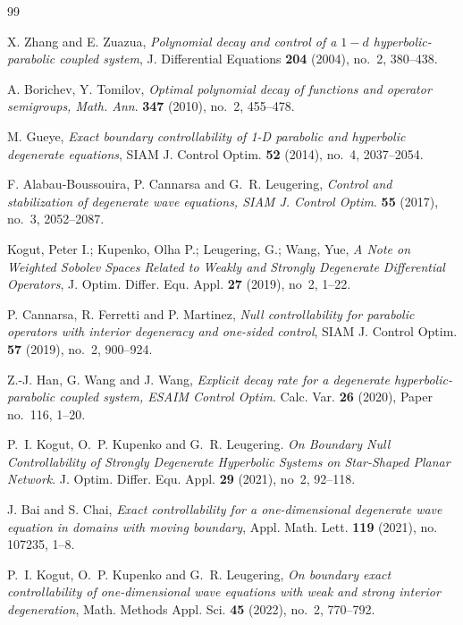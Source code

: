\documentclass[twoside]{article}
\theoremstyle{noparens}
\theoremstyle{definition}
\numberwithin{equation}{section}
\numberwithin{figure}{section}
\begin{document}
\begin{thebibliography}{99}

\setlength{\itemsep}{0ex}


{\footnotesize

  X. Zhang and E. Zuazua, \textit{Polynomial decay and control of a $1-d$ hyperbolic-parabolic coupled system}, J. Differential Equations {\bf 204} (2004), no.~2, 380--438.

 A. Borichev, Y. Tomilov, \textit{Optimal polynomial decay of functions and operator semigroups, Math. Ann}. {\bf 347} (2010), no.~2, 455--478.

 M. Gueye, \textit{Exact boundary controllability of 1-D parabolic and hyperbolic degenerate equations}, SIAM J. Control Optim. {\bf 52} (2014), no.~4, 2037--2054.

 F. Alabau-Boussouira, P. Cannarsa and G.~R. Leugering, \textit{Control and stabilization of degenerate wave equations, SIAM J. Control Optim}. {\bf 55} (2017), no.~3, 2052--2087.

 Kogut, Peter I.; Kupenko, Olha P.; Leugering, G.; Wang, Yue, \textit{A Note on Weighted Sobolev Spaces Related to Weakly and Strongly Degenerate Differential Operators}, J. Optim. Differ. Equ. Appl. {\bf 27} (2019), no~2, 1--22.

 P. Cannarsa, R. Ferretti and P. Martinez, \textit{Null controllability for parabolic operators with interior degeneracy and one-sided control}, SIAM J. Control Optim. {\bf 57} (2019), no.~2, 900--924.

 Z.-J. Han, G. Wang and J. Wang, \textit{Explicit decay rate for a degenerate hyperbolic-parabolic coupled system, ESAIM Control Optim}. Calc. Var. {\bf 26} (2020), Paper no.~116, 1--20.

 P.~I. Kogut, O.~P. Kupenko and G.~R. Leugering. \textit{On Boundary Null Controllability of Strongly Degenerate Hyperbolic Systems on Star-Shaped Planar Network}. J. Optim. Differ. Equ. Appl. {\bf 29} (2021), no~2, 92--118.

 J. Bai and S. Chai, \textit{Exact controllability for a one-dimensional degenerate wave equation in domains with moving boundary}, Appl. Math. Lett. {\bf 119} (2021), no. 107235, 1--8.

 P.~I. Kogut, O.~P. Kupenko and G.~R. Leugering, \textit{On boundary exact controllability of one-dimensional wave equations with weak and strong interior degeneration}, Math. Methods Appl. Sci. {\bf 45} (2022), no.~2, 770--792.

}
\end{thebibliography}
\end{document}
